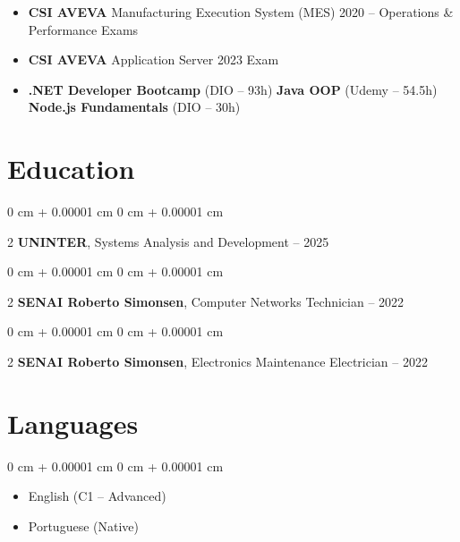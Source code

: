 \documentclass[10pt, letterpaper]{article}
\newenvironment{highlights}{ \begin{itemize}[ topsep=0.10 cm, parsep=0.10 cm, partopsep=0pt,
itemsep=0pt, leftmargin=0 cm + 10pt ] }{ \end{itemize} }
\newenvironment{onecolentry}{ \begin{adjustwidth}{ 0 cm + 0.00001 cm }{ 0 cm + 0.00001 cm }
}{ \end{adjustwidth} }
\newenvironment{twocolentry}[2][]{ \onecolentry \def\secondColumn{#2} \setcolumnwidth{\fill, 4.5 cm}
\begin{paracol}{2} }{ \switchcolumn \raggedleft \secondColumn \end{paracol}
\endonecolentry }
\begin{document}
    \begin{highlights}
        \item \textbf{CSI AVEVA} Manufacturing Execution System (MES) 2020 -- Operations \& Performance Exams
        \item \textbf{CSI AVEVA} Application Server 2023 Exam
        \item \textbf{.NET Developer Bootcamp} (DIO -- 93h) \quad \textbf{Java OOP} (Udemy -- 54.5h) \quad \textbf{Node.js Fundamentals} (DIO -- 30h)
    \end{highlights}

	\section{Education}

	\begin{twocolentry}
		{2023 -- 2025} \textbf{UNINTER}, Systems Analysis and Development
	\end{twocolentry}

	\begin{twocolentry}
		{2021 -- 2022} \textbf{SENAI Roberto Simonsen}, Computer Networks Technician
	\end{twocolentry}

    \begin{twocolentry}
		{2020 -- 2022} \textbf{SENAI Roberto Simonsen}, Electronics Maintenance Electrician
	\end{twocolentry}

	\section{Languages}

	\begin{onecolentry}
		\begin{highlights}
			\item English (C1 -- Advanced)
			\item Portuguese (Native)
		\end{highlights}
	\end{onecolentry}
\end{document}
